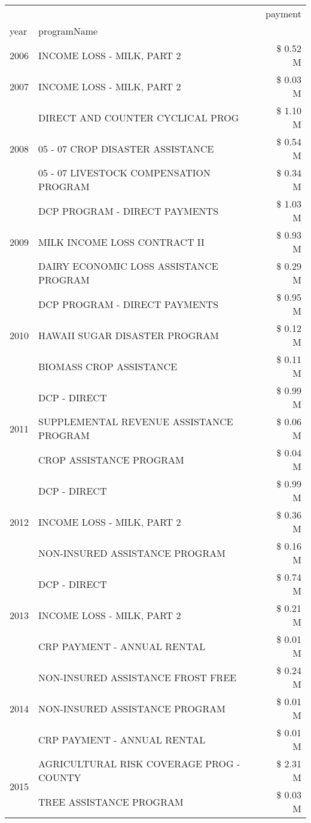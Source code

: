 \begin{tabular}{llr}
\toprule
 &  & payment \\
year & programName &  \\
\midrule
2006 & INCOME LOSS - MILK, PART 2 & \$ 0.52 M \\
\cline{1-3}
2007 & INCOME LOSS - MILK, PART 2 & \$ 0.03 M \\
\cline{1-3}
\multirow[t]{3}{*}{2008} & DIRECT AND COUNTER CYCLICAL PROG & \$ 1.10 M \\
 & 05 - 07 CROP DISASTER ASSISTANCE & \$ 0.54 M \\
 & 05 - 07 LIVESTOCK COMPENSATION PROGRAM & \$ 0.34 M \\
\cline{1-3}
\multirow[t]{3}{*}{2009} & DCP PROGRAM - DIRECT PAYMENTS & \$ 1.03 M \\
 & MILK INCOME LOSS CONTRACT II & \$ 0.93 M \\
 & DAIRY ECONOMIC LOSS ASSISTANCE PROGRAM & \$ 0.29 M \\
\cline{1-3}
\multirow[t]{3}{*}{2010} & DCP PROGRAM - DIRECT PAYMENTS & \$ 0.95 M \\
 & HAWAII SUGAR DISASTER PROGRAM & \$ 0.12 M \\
 & BIOMASS CROP ASSISTANCE & \$ 0.11 M \\
\cline{1-3}
\multirow[t]{3}{*}{2011} & DCP - DIRECT & \$ 0.99 M \\
 & SUPPLEMENTAL REVENUE ASSISTANCE PROGRAM & \$ 0.06 M \\
 & CROP ASSISTANCE PROGRAM & \$ 0.04 M \\
\cline{1-3}
\multirow[t]{3}{*}{2012} & DCP - DIRECT & \$ 0.99 M \\
 & INCOME LOSS - MILK, PART 2 & \$ 0.36 M \\
 & NON-INSURED ASSISTANCE PROGRAM & \$ 0.16 M \\
\cline{1-3}
\multirow[t]{3}{*}{2013} & DCP - DIRECT & \$ 0.74 M \\
 & INCOME LOSS - MILK, PART 2 & \$ 0.21 M \\
 & CRP PAYMENT - ANNUAL RENTAL & \$ 0.01 M \\
\cline{1-3}
\multirow[t]{3}{*}{2014} & NON-INSURED ASSISTANCE FROST FREE & \$ 0.24 M \\
 & NON-INSURED ASSISTANCE PROGRAM & \$ 0.01 M \\
 & CRP PAYMENT - ANNUAL RENTAL & \$ 0.01 M \\
\cline{1-3}
\multirow[t]{3}{*}{2015} & AGRICULTURAL RISK COVERAGE PROG - COUNTY & \$ 2.31 M \\
 & TREE ASSISTANCE PROGRAM & \$ 0.03 M \\

\end{tabular}
